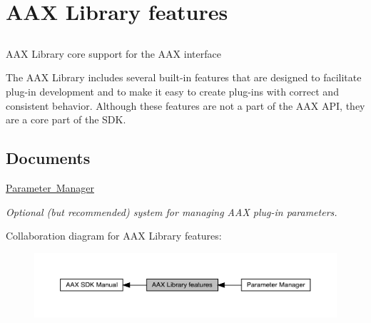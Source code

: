 \hypertarget{a00813}{}\section{A\+AX Library features}
\label{a00813}


\subsection{ }
A\+AX Library core support for the A\+AX interface 

The A\+AX Library includes several built-\/in features that are designed to facilitate plug-\/in development and to make it easy to create plug-\/ins with correct and consistent behavior. Although these features are not a part of the A\+AX A\+PI, they are a core part of the S\+DK. \subsection*{Documents}
\begin{DoxyCompactItemize}
\item 
\mbox{\hyperlink{a00814}{Parameter Manager}}
\begin{DoxyCompactList}\small\item\em Optional (but recommended) system for managing A\+AX plug-\/in parameters. \end{DoxyCompactList}\end{DoxyCompactItemize}
Collaboration diagram for A\+AX Library features\+:
\nopagebreak
\begin{figure}[H]
\begin{center}
\leavevmode
\includegraphics[width=350pt]{a00813}
\end{center}
\end{figure}

